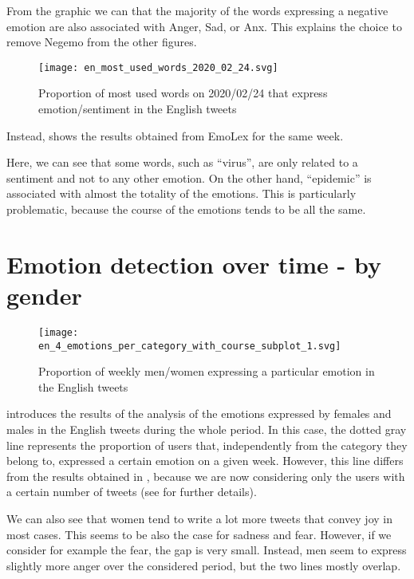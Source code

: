 From the graphic we can that the majority of the words expressing a negative emotion are also associated with Anger, Sad, or Anx. This explains the choice to remove Negemo from the other figures.

\begin{figure}[H]
	\centering
    	\texttt{[image: en\_most\_used\_words\_2020\_02\_24.svg]}
    	\caption{Proportion of most used words on 2020/02/24 that express emotion/sentiment in the English tweets}
    	\label{fig:en-most-used-words-2020-02-24}
\end{figure}

Instead,  shows the results obtained from EmoLex for the same week.

Here, we can see that some words, such as “virus”, are only related to a sentiment and not to any other emotion. On the other hand, “epidemic” is associated with almost the totality of the emotions. This is particularly problematic, because the course of the emotions tends to be all the same.

\section{Emotion detection over time - by gender}
\label{sec:emotion-by-gender-results}

\begin{figure}[H]
	\centering
    	\texttt{[image: en\_4\_emotions\_per\_category\_with\_course\_subplot\_1.svg]}
    	\caption{Proportion of weekly men/women expressing a particular emotion in the English tweets}
    	\label{fig:en-4-emotions-per-category-course-subplot-1}
\end{figure}


 introduces the results of the analysis of the emotions expressed by females and males in the English tweets during the whole period. In this case, the dotted gray line represents the proportion of users that, independently from the category they belong to, expressed a certain emotion on a given week. However, this line differs from the results obtained in , because we are now considering only the users with a certain number of tweets (see  for further details).

We can also see that women tend to write a lot more tweets that convey joy in most cases. This seems to be also the case for sadness and fear. However, if we consider for example the fear, the gap is very small. Instead, men seem to express slightly more anger over the considered period, but the two lines mostly overlap.

